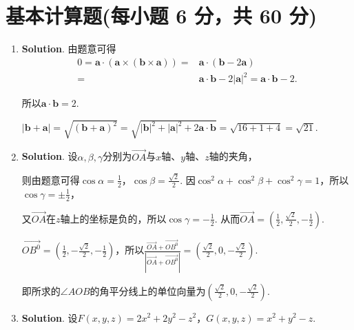 \documentclass[../Main.tex]{subfiles}
\begin{document}
\section{基本计算题(每小题 6 分，共 60 分)}
\begin{enumerate}
    \item \textbf{Solution}. 由题意可得
          \[
              \begin{aligned}
                  0 = \boldsymbol{a}\cdot \left(\boldsymbol{a}\times (\boldsymbol{b}\times\boldsymbol{a})\right) = & \boldsymbol{a}\cdot (\boldsymbol{b}-2\boldsymbol{a})                                         \\
                  =                                                                                                & \boldsymbol{a}\cdot\boldsymbol{b}-2|\boldsymbol{a}|^{2}=\boldsymbol{a}\cdot\boldsymbol{b}-2.
              \end{aligned}
          \]

          所以$\boldsymbol{a}\cdot\boldsymbol{b}=2$.

          $|\boldsymbol{b}+\boldsymbol{a}| = \sqrt{(\boldsymbol{b}+\boldsymbol{a})^{2}}
              = \sqrt{|\boldsymbol{b}|^{2}+|\boldsymbol{a}|^{2}+2\boldsymbol{a}\cdot\boldsymbol{b}}
              = \sqrt{16+1+4}= \sqrt{21}$.

    \item \textbf{Solution}. 设$\alpha,\beta,\gamma$分别为$\overrightarrow{OA}$与$x$轴、$y$轴、$z$轴的夹角，

          则由题意可得$\cos \alpha = \frac{1}{2}$，$\cos \beta = \frac{\sqrt{2}}{2}$.
          因$\cos^{2} \alpha + \cos^{2} \beta + \cos^{2} \gamma = 1$，所以$\cos \gamma
              = \pm \frac{1}{2}$，

          又$\overrightarrow{OA}$在$z$轴上的坐标是负的，所以$\cos \gamma = -\frac{1}{2}$.
          从而$\overrightarrow{OA}= \left(\frac{1}{2},\frac{\sqrt{2}}{2},-\frac{1}{2}
              \right)$.

          $\overrightarrow{OB^0}=\left(\frac{1}{2},-\frac{\sqrt{2}}{2},-\frac{1}{2}\right
              )$，所以$\frac{\overrightarrow{OA}+\overrightarrow{OB^0}}{|\overrightarrow{OA}+\overrightarrow{OB^0}|}
              = \left(\frac{\sqrt{2}}{2},0,-\frac{\sqrt{2}}{2}\right)$.

          即所求的$\angle AOB$的角平分线上的单位向量为$\left(\frac{\sqrt{2}}{2},0,-\frac{\sqrt{2}}{2}
              \right)$.

    \item \textbf{Solution}. 设$F(x,y,z) = 2x^{2}+2y^{2}-z^{2}$，$G(x,y,z)=x^{2}+
              y^{2}-z$.


\end{enumerate}
\end{document}
